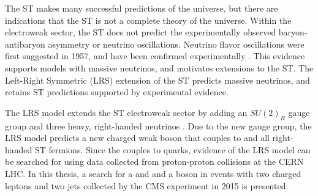 The ST makes many successful predictions of the universe, but there are indications that the ST is 
not a complete theory of the universe.  Within the electroweak sector, the ST does 
not predict the experimentally observed baryon-antibaryon asymmetry or neutrino oscillations.  Neutrino flavor 
oscillations were first suggested in 1957, and have been confirmed experimentally 
\cite{kamiokandeTwo,solarNuSummary,NOvAresults,mainzPhaseIIResults,t2kResults,dayaBayResults}.  This evidence supports 
models with massive neutrinos, and motivates extensions to the ST.  The Left-Right Symmetric (LRS) extension of 
the ST predicts massive neutrinos, and retains ST predictions supported by experimental evidence.

The LRS model extends the ST electroweak sector by adding an $SU(2)_{R}$ gauge group and three heavy, right-handed 
neutrinos \nul.  Due to the new gauge group, the LRS model predicts a new charged weak boson \WR that couples to 
\nul and all right-handed ST fermions.  Since the \WR couples to quarks, evidence of the LRS model can be searched for 
using data collected from proton-proton collisions at the CERN LHC.  In this thesis, a search for a \WR and \nul 
and a \WR boson in events with two charged leptons and two jets collected by the CMS experiment in 2015 
is presented.


